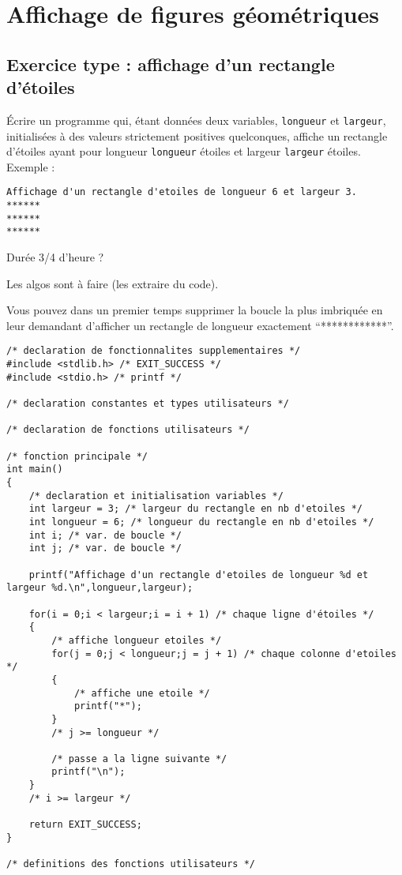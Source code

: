 % 

\section{Affichage de figures géométriques}


\subsection{Exercice type : affichage d'un rectangle d'étoiles}

Écrire un programme  qui, étant données deux variables,
\verb|longueur| et \verb|largeur|, initialisées à des valeurs
strictement positives quelconques, affiche un rectangle d'étoiles ayant pour
longueur \verb|longueur| étoiles et largeur \verb|largeur|
étoiles. Exemple :
\begin{verbatim}
Affichage d'un rectangle d'etoiles de longueur 6 et largeur 3.
******
******
******
\end{verbatim}

\begin{correction}
Durée 3/4 d'heure ?

Les algos sont à faire (les extraire du code).

Vous pouvez dans un premier temps supprimer la boucle la plus imbriquée en leur demandant d'afficher un rectangle de longueur exactement ``************''.

\begin{verbatim}
/* declaration de fonctionnalites supplementaires */
#include <stdlib.h> /* EXIT_SUCCESS */
#include <stdio.h> /* printf */

/* declaration constantes et types utilisateurs */

/* declaration de fonctions utilisateurs */

/* fonction principale */
int main()
{
    /* declaration et initialisation variables */
    int largeur = 3; /* largeur du rectangle en nb d'etoiles */
    int longueur = 6; /* longueur du rectangle en nb d'etoiles */
    int i; /* var. de boucle */
    int j; /* var. de boucle */

    printf("Affichage d'un rectangle d'etoiles de longueur %d et largeur %d.\n",longueur,largeur);

    for(i = 0;i < largeur;i = i + 1) /* chaque ligne d'étoiles */
    {
        /* affiche longueur etoiles */
        for(j = 0;j < longueur;j = j + 1) /* chaque colonne d'etoiles */
        {
            /* affiche une etoile */
            printf("*");
        }
        /* j >= longueur */

        /* passe a la ligne suivante */
        printf("\n");
    }
    /* i >= largeur */

    return EXIT_SUCCESS;
}

/* definitions des fonctions utilisateurs */
\end{verbatim}
\end{correction}

